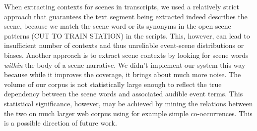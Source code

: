 When extracting contexts for scenes in transcripts, we used a
relatively strict approach that guarantees the text segment being extracted indeed
describes the scene, because we match the scene word or its synonyms in 
the open scene patterns (\eg CUT TO TRAIN STATION) in the scripts. 
This, however, can lead to insufficient
number of contexts and thus unreliable event-scene distributions or biases.
Another approach is to extract scene contexts by looking for scene words {\em within}
the body of a scene narrative. We didn't implement our system this way
because while it improves the coverage, it brings about much more noise.
The volume of our corpus is not statistically large enough to reflect the
true dependency between the scene words and associated audible event terms.
This statistical significance, however, may be achieved by mining the relations
between the two on much larger web corpus using for example simple
co-occurrences. This is a possible direction of future work.

